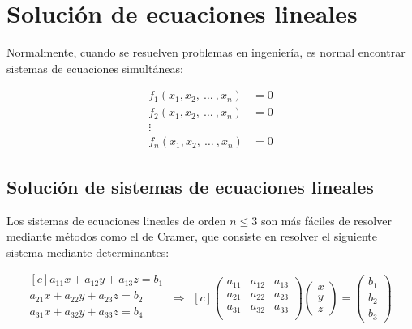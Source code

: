 \chapter{Solución de ecuaciones lineales}

Normalmente, cuando se resuelven problemas en ingeniería, es normal encontrar
sistemas de ecuaciones simultáneas:

\begin{align*}
    f_1(x_1, x_2,\ \dots \ , x_n) &= 0 \\
    f_2(x_1, x_2,\ \dots \ , x_n) &= 0 \\
    \vdots \\
    f_n(x_1, x_2,\ \dots \ , x_n) &= 0
\end{align*}

\section{Solución de sistemas de ecuaciones lineales}

Los sistemas de ecuaciones lineales de orden $n \leq 3$ son más fáciles de
resolver mediante métodos como el de Cramer, que consiste en resolver el
siguiente sistema mediante determinantes:

\begin{equation*}
    \begin{aligned}[c]
        a_{11} x + a_{12} y + a_{13} z = b_1 \\
        a_{21} x + a_{22} y + a_{23} z = b_2 \\
        a_{31} x + a_{32} y + a_{33} z = b_4 \\
    \end{aligned}
    \ \Longrightarrow
    \begin{aligned}[c]
        \begin{pmatrix}
            a_{11} & a_{12} & a_{13}\\
            a_{21} & a_{22} & a_{23}\\
            a_{31} & a_{32} & a_{33}\\
        \end{pmatrix}
        \begin{pmatrix}
            x \\
            y \\
            z
        \end{pmatrix}
        =
        \begin{pmatrix}
            b_1 \\
            b_2 \\
            b_3
        \end{pmatrix}
    \end{aligned}
\end{equation*}

